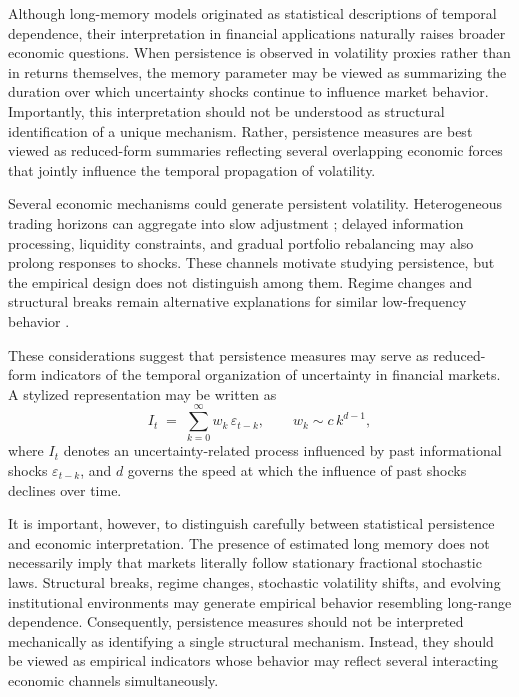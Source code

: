 \documentclass[jrfm,article,submit,moreauthors,pdftex]{Definitions/mdpi}
\begin{document}
Although long-memory models originated as statistical descriptions of
temporal dependence, their interpretation in financial applications
naturally raises broader economic questions. When persistence is observed in
volatility proxies rather than in returns themselves, the memory parameter
may be viewed as summarizing the duration over which uncertainty shocks
continue to influence market behavior. Importantly, this interpretation
should not be understood as structural identification of a unique mechanism.
Rather, persistence measures are best viewed as reduced-form summaries
reflecting several overlapping economic forces that jointly influence the
temporal propagation of volatility.

Several economic mechanisms could generate persistent volatility.
Heterogeneous trading horizons can aggregate into slow adjustment
\citep{muller1997volatilities,corsi2009simple}; delayed information
processing, liquidity constraints, and gradual portfolio rebalancing may
also prolong responses to shocks. These channels motivate studying
persistence, but the empirical design does not distinguish among them.
Regime changes and structural breaks remain alternative explanations for
similar low-frequency behavior \citep{mikosch2004nonstationarities}.

These considerations suggest that persistence measures may serve as
reduced-form indicators of the temporal organization of uncertainty in
financial markets. A stylized representation may be written as
\begin{equation}
  I_t \;=\; \sum_{k=0}^{\infty} w_k\, \varepsilon_{t-k}, \qquad
  w_k \sim c\, k^{d-1},
  \label{eq:info-persistence}
\end{equation}
where $I_t$ denotes an uncertainty-related process influenced by past
informational shocks $\varepsilon_{t-k}$, and $d$ governs the speed at
which the influence of past shocks declines over time.

It is important, however, to distinguish carefully between statistical
persistence and economic interpretation. The presence of estimated long
memory does not necessarily imply that markets literally follow stationary
fractional stochastic laws. Structural breaks, regime changes, stochastic
volatility shifts, and evolving institutional environments may generate
empirical behavior resembling long-range dependence. Consequently,
persistence measures should not be interpreted mechanically as identifying
a single structural mechanism. Instead, they should be viewed as empirical
indicators whose behavior may reflect several interacting economic channels
simultaneously.
\end{document}
